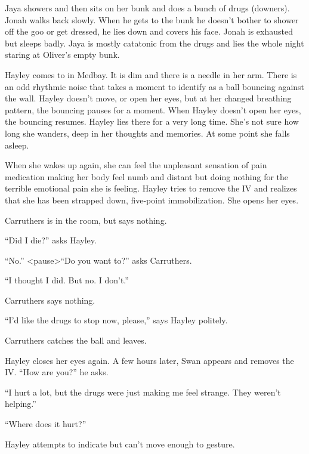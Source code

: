 
Jaya showers and then sits on her bunk and does a bunch of drugs (downers).  Jonah walks back slowly.  When he gets to the bunk he doesn't bother to shower off the goo or get dressed, he lies down and covers his face.  Jonah is exhausted but sleeps badly.  Jaya is mostly catatonic from the drugs and lies the whole night staring at Oliver's empty bunk.





Hayley comes to in Medbay.  It is dim and there is a needle in her arm.  There is an odd rhythmic noise that takes a moment to identify as a ball bouncing against the wall.  Hayley doesn't move, or open her eyes, but at her changed breathing pattern, the bouncing pauses for a moment.  When Hayley doesn't open her eyes, the bouncing resumes.  Hayley lies there for a very long time.  She's not sure how long she wanders, deep in her thoughts and memories.  At some point she falls asleep.



When she wakes up again, she can feel the unpleasant sensation of pain medication making her body feel numb and distant but doing nothing for the terrible emotional pain she is feeling.  Hayley tries to remove the IV and realizes that she has been strapped down, five-point immobilization.  She opens her eyes.



Carruthers is in the room, but says nothing.

``Did I die?'' asks Hayley.

``No.''  \textless pause\textgreater   ``Do you want to?'' asks Carruthers.

``I thought I did.  But no.  I don't.''  

Carruthers says nothing.

``I'd like the drugs to stop now, please,'' says Hayley politely.

Carruthers catches the ball and leaves.



Hayley closes her eyes again.  A few hours later, Swan appears and removes the IV.  ``How are you?'' he asks.

``I hurt a lot, but the drugs were just making me feel strange.  They weren't helping.''

``Where does it hurt?''

Hayley attempts to indicate but can't move enough to gesture.

